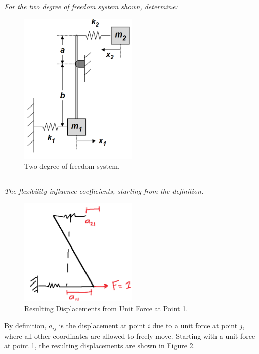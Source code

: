 \section{}
\textit{For the two degree of freedom system shown, determine:}
\begin{figure}[H]
    \centering
    \includegraphics[width=0.5\textwidth]{Questions/Figures/Q1 Problem Diagram.png}
    \caption{Two degree of freedom system.}
    \label{fig:Q1}
\end{figure}

\subsection{}
\textit{The flexibility influence coefficients, starting from the definition.}

\begin{figure}[H]
    \centering
    \includegraphics[width=0.5\textwidth]{Questions/Figures/Q1 a_i1.png}
    \caption{Resulting Displacements from Unit Force at Point 1.}
    \label{fig:Q1 a_i1}
\end{figure}
By definition, $a_{ij}$ is the displacement at point $i$ due to a unit force at point $j$, where all other coordinates are allowed to freely move. Starting with a unit force at point 1, the resulting displacements are shown in Figure \ref{fig:Q1 a_i1}. 

